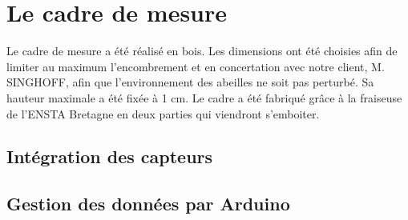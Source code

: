 \chapter{Le cadre de mesure}

Le cadre de mesure a été réalisé en bois. Les dimensions ont été choisies afin de limiter au maximum l'encombrement et en concertation avec notre client, M. SINGHOFF, afin que l'environnement des abeilles ne soit pas perturbé. Sa hauteur maximale a été fixée à 1 cm. 
Le cadre a été fabriqué grâce à la fraiseuse de l'ENSTA Bretagne en deux parties qui viendront s'emboiter.

\section{Intégration des capteurs}


\section{Gestion des données par Arduino}